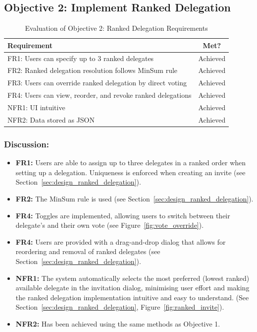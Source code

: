 \subsection{Objective 2: Implement Ranked Delegation}

\begin{table}[H]
\centering
\begin{tabular}{|p{9cm}|c|}
\hline
\textbf{Requirement} & \textbf{Met?} \\ \hline
FR1: Users can specify up to 3 ranked delegates & Achieved \\ \hline
FR2: Ranked delegation resolution follows MinSum rule & Achieved \\ \hline
FR3: Users can override ranked delegation by direct voting & Achieved \\ \hline
FR4: Users can view, reorder, and revoke ranked delegations & Achieved \\ \hline
NFR1: UI intuitive & Achieved \\ \hline
NFR2: Data stored as JSON & Achieved \\ \hline
\end{tabular}
\caption{Evaluation of Objective 2: Ranked Delegation Requirements}
\label{tab:objective2_requirements}
\end{table}

\subsubsection{Discussion:}

\begin{itemize}
    \item \textbf{FR1:} Users are able to assign up to three delegates in a ranked order when setting up a delegation. Uniqueness is enforced when creating an invite (see Section~\ref{sec:design_ranked_delegation}).
    \item \textbf{FR2:} The MinSum rule is used (see Section~\ref{sec:design_ranked_delegation}).
    \item \textbf{FR4:} Toggles are implemented, allowing users to switch between their delegate's and their own vote (see Figure~\ref{fig:vote_override}).
    \item \textbf{FR4:} Users are provided with a drag-and-drop dialog that allows for reordering and removal of ranked delegates (see Section~\ref{sec:design_ranked_delegation}).
    \item \textbf{NFR1:} The system automatically selects the most preferred (lowest ranked) available delegate in the invitation dialog, minimising user effort and making the ranked delegation implementation intuitive and easy to understand. (See Section~\ref{sec:design_ranked_delegation}, Figure~\ref{fig:ranked_invite}).
    \item \textbf{NFR2:} Has been achieved using the same methods as Objective 1.
\end{itemize}

